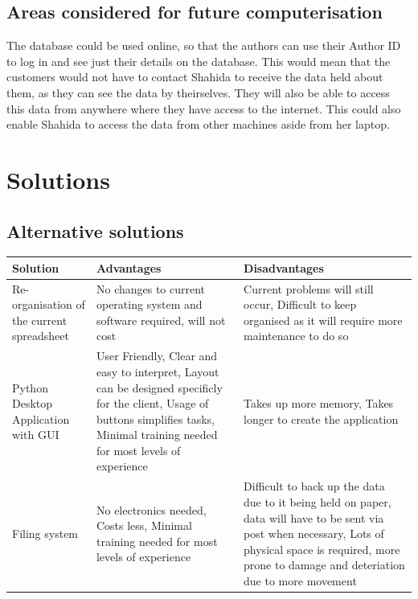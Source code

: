 \subsection{Areas considered for future computerisation}

The database could be used online, so that the authors can use their Author ID to log in and see just their details on the database. This would mean that the customers would not have to contact Shahida to receive the data held about them, as they can see the data by theirselves. They will also be able to access this data from anywhere where they have access to the internet. This could also enable Shahida to access the data from other machines aside from her laptop.

\section{Solutions}

\subsection{Alternative solutions}
\begin{center}
\begin{tabular}{|p{2.5cm}|p{3.5cm}|p{3.5cm}|}
    \hline
    \textbf{Solution} & \textbf{Advantages} & \textbf{Disadvantages} \\ \hline

    Re-organisation of the current spreadsheet & No changes to current operating system and software required, will not cost & Current problems will still occur, Difficult to keep organised as it will require more maintenance to do so \\ \hline

    Python Desktop Application with GUI & User Friendly, Clear and easy to interpret, Layout can be designed specificly for the client, Usage of buttons simplifies tasks, Minimal training needed for most levels of experience & Takes up more memory, Takes longer to create the application  \\ \hline

    Filing system & No electronics needed, Costs less, Minimal training needed for most levels of experience & Difficult to back up the data due to it being held on paper, data will have to be sent via post when necessary, Lots of physical space is required, more prone to damage and deteriation due to more movement \\ \hline

    \hline
\end{tabular}
\end{center}
